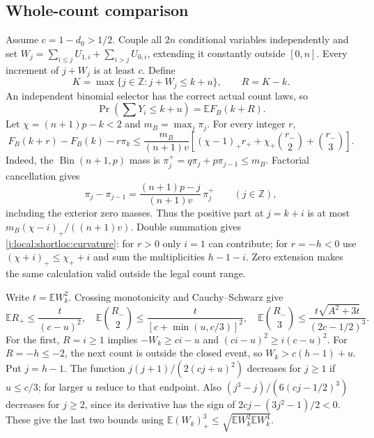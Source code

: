 \subsection{Whole-count comparison}

Assume $c=1-d_0>1/2$. Couple all $2n$ conditional variables independently and
set $W_j=\sum_{i\le j}U_{1,i}+\sum_{i>j}U_{0,i}$, extending it constantly
outside $[0,n]$. Every increment of $j+W_j$ is at least $c$. Define
\[
 K=\max\{j\in\mathbb Z:j+W_j\le k+u\},\qquad R=K-k.
\]
An independent binomial selector has the correct actual count laws, so
\begin{equation}\label{j:local:shortloc:cutoff}
                  \Pr(\textstyle\sum Y_i\le k+u)=\mathbb EF_B(k+R).
\end{equation}
Let $\chi=(n+1)p-k<2$ and $m_B=\max_j\pi_j$. For every integer $r$,
\begin{equation}\label{j:local:shortloc:curvature}
 F_B(k+r)-F_B(k)-r\pi_k\le\frac{m_B}{(n+1)v}
 \left[(\chi-1)_+r_++\chi_+\binom{r_-}{2}+\binom{r_-}{3}\right].
\end{equation}
Indeed, the $\operatorname{Bin}(n+1,p)$ mass is
$\pi_j^+=q\pi_j+p\pi_{j-1}\le m_B$. Factorial cancellation gives
\[
 \pi_j-\pi_{j-1}=\frac{(n+1)p-j}{(n+1)v}\,\pi_j^+
 \qquad(j\in\mathbb Z),
\]
including the exterior zero masses. Thus the positive part at $j=k+i$
is at most $m_B(\chi-i)_+/((n+1)v)$.
Double summation gives \eqref{j:local:shortloc:curvature}: for $r>0$ only $i=1$
can contribute; for $r=-h<0$ use $(\chi+i)_+\le\chi_++i$ and sum the
multiplicities $h-1-i$. Zero extension makes the same calculation valid
outside the legal count range.

Write $t=\mathbb EW_k^2$. Crossing monotonicity and Cauchy--Schwarz give
\begin{equation}\label{j:local:shortloc:crossingmoments}
 \mathbb ER_+\le\frac{t}{(c-u)^2},\quad
 \mathbb E\binom{R_-}{2}\le\frac{t}{[c+\min(u,c/3)]^2},\quad
 \mathbb E\binom{R_-}{3}\le\frac{t\sqrt{A^2+3t}}{(2c-1/2)^3}.
\end{equation}
For the first, $R=i\ge1$ implies $-W_k\ge ci-u$ and
$(ci-u)^2\ge i(c-u)^2$. For $R=-h\le-2$, the next count is outside the
closed event, so $W_k>c(h-1)+u$. Put $j=h-1$.
The function $j(j+1)/(2(cj+u)^2)$ decreases for $j\ge1$ if $u\le c/3$;
for larger $u$ reduce to that endpoint. Also
$(j^3-j)/(6(cj-1/2)^3)$ decreases for $j\ge2$, since its derivative has
the sign of $2cj-(3j^2-1)/2<0$. These give the last two bounds using
$\mathbb E(W_k)_+^3\le\sqrt{\mathbb EW_k^2\mathbb EW_k^4}$.

